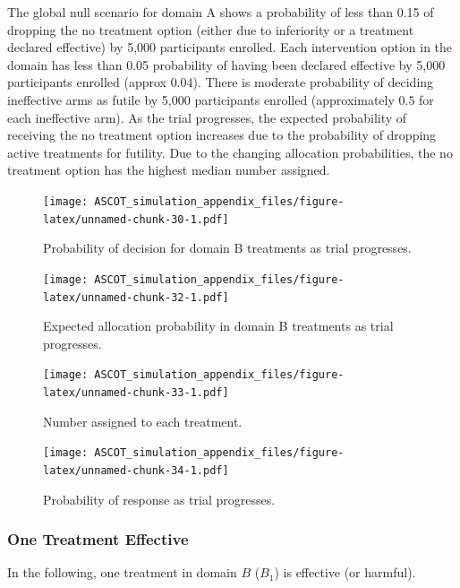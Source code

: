 \documentclass[
]{article}
\begin{document}
The global null scenario for domain A shows a probability of less than 0.15 of dropping the no treatment option (either due to inferiority or a treatment declared effective) by 5,000 participants enrolled.
Each intervention option in the domain has less than 0.05 probability of having been declared effective by 5,000 participants enrolled (approx \(0.04\)).
There is moderate probability of deciding ineffective arms as futile by 5,000 participants enrolled (approximately \(0.5\) for each ineffective arm).
As the trial progresses, the expected probability of receiving the no treatment option increases due to the probability of dropping active treatments for futility.
Due to the changing allocation probabilities, the no treatment option has the highest median number assigned.

\begin{figure}
\centering
\texttt{[image: ASCOT\_simulation\_appendix\_files/figure-latex/unnamed-chunk-30-1.pdf]}
\caption{\label{fig:unnamed-chunk-30}Probability of decision for domain B treatments as trial progresses.}
\end{figure}

\begin{figure}
\centering
\texttt{[image: ASCOT\_simulation\_appendix\_files/figure-latex/unnamed-chunk-32-1.pdf]}
\caption{\label{fig:unnamed-chunk-32}Expected allocation probability in domain B treatments as trial progresses.}
\end{figure}

\begin{figure}
\centering
\texttt{[image: ASCOT\_simulation\_appendix\_files/figure-latex/unnamed-chunk-33-1.pdf]}
\caption{\label{fig:unnamed-chunk-33}Number assigned to each treatment.}
\end{figure}

\begin{figure}
\centering
\texttt{[image: ASCOT\_simulation\_appendix\_files/figure-latex/unnamed-chunk-34-1.pdf]}
\caption{\label{fig:unnamed-chunk-34}Probability of response as trial progresses.}
\end{figure}

\clearpage

\hypertarget{one-treatment-effective-1}{%
\subsubsection{One Treatment Effective}\label{one-treatment-effective-1}}

In the following, one treatment in domain \(B\) (\(B_1\)) is effective (or harmful).
\end{document}
